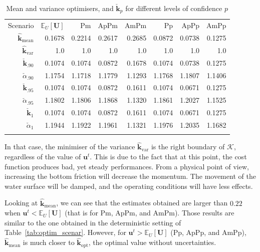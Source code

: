 \documentclass[npg, manuscript]{copernicus}
\newcommand{\Ex}{\mathbb{E}}
\begin{document}
\begin{table}[!h]
  \caption{Mean and variance optimisers, and $\check{\mathbf{k}}_p$ for different levels of confidence $p$}
  \label{tab:res_robust}
  \begin{tabular}{rrrrrrrr} \tophline
    Scenario&$\Ex_U[\mathbf{U}]$ & Pm & ApPm & AmPm & Pp & ApPp & AmPp \\  \middlehline
  $\hat{\mathbf{k}}_{\mathrm{mean}}$ & 0.1678    & 0.2214  & 0.2617 & 0.2685 & 0.0872 & 0.0738 & 0.1275 \\
  $\hat{\mathbf{k}}_{\mathrm{var}}$  & 1.0      &  1.0  & 1.0 & 1.0 &  1.0 & 1.0 & 1.0 \\ \middlehline
  $\check{\mathbf{k}}_{.90}$ & 0.1074 & 0.1074 & 0.0872 & 0.1678 & 0.1074  & 0.0738 & 0.1275 \\
  $\check{\alpha}_{.90}$    & 1.1754  & 1.1718 & 1.1779 & 1.1293 & 1.1768  & 1.1807 & 1.1406 \\\middlehline

  $\check{\mathbf{k}}_{.95}$ & 0.1074 & 0.1074 & 0.0872 & 0.1611 & 0.1074  & 0.0671 & 0.1275 \\
  $\check{\alpha}_{.95}$ & 1.1802 & 1.1806 & 1.1868 & 1.1320 & 1.1861  & 1.2027 & 1.1525 \\\middlehline
    $\check{\mathbf{k}}_{1}$& 0.1074 & 0.1074 & 0.0872 & 0.1611 & 0.1074  & 0.0671 & 0.1275 \\
  $\check{\alpha}_{1}$ & 1.1944    & 1.1922 & 1.1961 & 1.1321 & 1.1976  & 1.2035 & 1.1682 \\\middlehline
\end{tabular}
\end{table}


In that case, the minimiser of the variance $\hat{\mathbf{k}}_{\mathrm{var}}$ is the right boundary of $\mathcal{K}$, regardless of the value of $\mathbf{u}^t$. This is due to the fact that at this point, the cost function produces bad, yet steady performances. From a physical point of view, increasing the bottom friction will decrease the momentum. The movement of the water surface will be damped, and the operating conditions will have less effects.


Looking at $\hat{\mathbf{k}}_{\mathrm{mean}}$, we can see that the estimates obtained are larger than $0.22$ when $\mathbf{u}^t< \Ex_U[\mathbf{U}]$ (that is for Pm, ApPm, and AmPm). Those results are similar to the one obtained in the deterministic setting of Table~\ref{tab:optim_scenar}. However, for $\mathbf{u}^t> \Ex_U[\mathbf{U}]$ (Pp, ApPp, and AmPp), $\hat{\mathbf{k}}_{\mathrm{mean}}$ is much closer to $\hat{\mathbf{k}}_{\mathrm{opt}}$, the optimal value without uncertainties.
\end{document}
